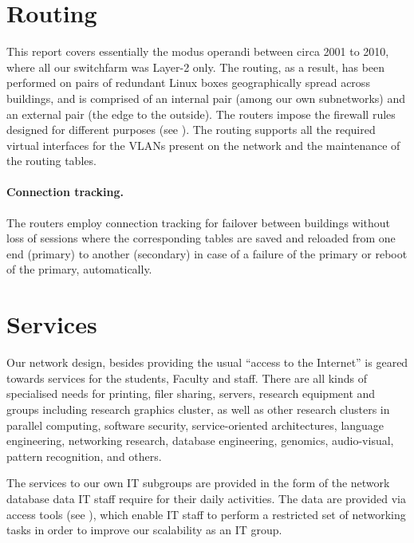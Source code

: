 \section{Routing}
\label{sect:routing}

This report covers essentially the modus operandi between circa 2001 to 2010,
where all our switchfarm was Layer-2 only. The routing, as a result, has been
performed on pairs of redundant Linux boxes geographically spread across
buildings, and is comprised of an internal pair (among our own subnetworks) and
an external pair (the edge to the outside). The routers
impose the firewall rules designed for different purposes (see ).
The routing supports all the required virtual interfaces for the VLANs
present on the network and the maintenance of the routing tables.

\paragraph{Connection tracking.}
\label{sect:conntrack}

The routers employ connection tracking for failover between buildings
without loss of sessions where the corresponding tables are saved and
reloaded from one end (primary) to another (secondary) in case of a failure of the primary or reboot
of the primary, automatically.


\section{Services}
\label{sect:services}

Our network design, besides providing the usual ``access to the Internet''
is geared towards services for the students, Faculty and staff.
There are all kinds of specialised needs for printing, filer sharing,
servers, research equipment and groups including research
graphics cluster, as well as other research clusters in parallel
computing, software security, service-oriented architectures,
language engineering, networking research, database engineering,
genomics, audio-visual, pattern recognition, and others.

The services to our own IT subgroups are provided in the form
of the network database data IT staff require for their daily activities.
The data are provided via access tools (see ), which enable IT staff to perform
a restricted set of networking tasks in order to improve our scalability
as an IT group.

